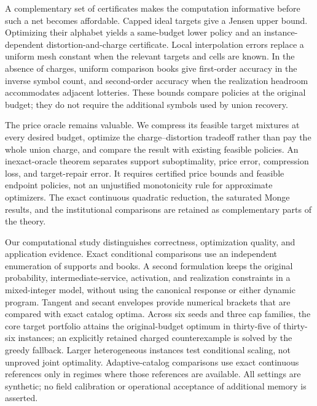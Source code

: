 A complementary set of certificates makes the computation informative before such a net becomes affordable. Capped ideal targets give a Jensen upper bound. Optimizing their alphabet yields a same-budget lower policy and an instance-dependent distortion-and-charge certificate. Local interpolation errors replace a uniform mesh constant when the relevant targets and cells are known. In the absence of charges, uniform comparison books give first-order accuracy in the inverse symbol count, and second-order accuracy when the realization headroom accommodates adjacent lotteries. These bounds compare policies at the original budget; they do not require the additional symbols used by union recovery.

The price oracle remains valuable. We compress its feasible target mixtures at every desired budget, optimize the charge--distortion tradeoff rather than pay the whole union charge, and compare the result with existing feasible policies. An inexact-oracle theorem separates support suboptimality, price error, compression loss, and target-repair error. It requires certified price bounds and feasible endpoint policies, not an unjustified monotonicity rule for approximate optimizers. The exact continuous quadratic reduction, the saturated Monge results, and the institutional comparisons are retained as complementary parts of the theory.

Our computational study distinguishes correctness, optimization quality, and application evidence. Exact conditional comparisons use an independent enumeration of supports and books. A second formulation keeps the original probability, intermediate-service, activation, and realization constraints in a mixed-integer model, without using the canonical response or either dynamic program. Tangent and secant envelopes provide numerical brackets that are compared with exact catalog optima. Across six seeds and three cap families, the core target portfolio attains the original-budget optimum in thirty-five of thirty-six instances; an explicitly retained charged counterexample is solved by the greedy fallback. Larger heterogeneous instances test conditional scaling, not unproved joint optimality. Adaptive-catalog comparisons use exact continuous references only in regimes where those references are available. All settings are synthetic; no field calibration or operational acceptance of additional memory is asserted.

